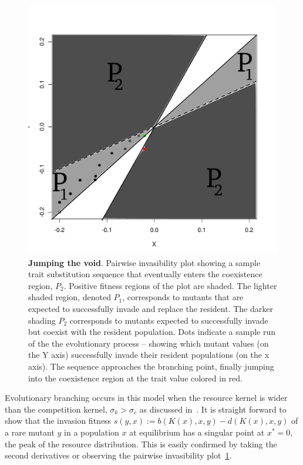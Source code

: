 \documentclass[authoryear,review,11pt]{elsarticle}
\begin{document}
\begin{figure}[h]
\begin{center}
\includegraphics[width=\textwidth]{images/jump_void2.pdf}
\end{center}
\caption{\textbf{Jumping the void}. Pairwise invasibility plot showing a sample trait substitution sequence that eventually enters the coexistence region, $P_2$.  Positive fitness regions of the plot are shaded.  The lighter shaded region, denoted $P_1$, corresponds to mutants that are expected to successfully invade and replace the resident.  The darker shading $P_2$ corresponds to mutants expected to successfully invade but coexist with the resident population.   Dots indicate a sample run of the the evolutionary process -- showing which mutant values (on the Y axis) successfully invade their resident populations (on the x axis).  The sequence approaches the branching point, finally jumping into the coexistence region at the trait value colored in red.  }
\label{fig:pip}
\end{figure}

Evolutionary branching occurs in this model when the resource kernel is wider than the competition kernel, $\sigma_k > \sigma_c$ as discussed in~\citet{geritz_evoeco1998, dieckmann_nat1999}.  It is straight forward to show that the invasion fitness $s(y,x) := b(K(x),x,y) -d(K(x), x,y)$ of a rare mutant $y$ in a population $x$ at equilibrium has a singular point at $x^*=0$, the peak of the resource distribution.  This is easily confirmed by taking the second derivatives or observing the pairwise invasibility plot~\ref{fig:pip}.  
\end{document}
